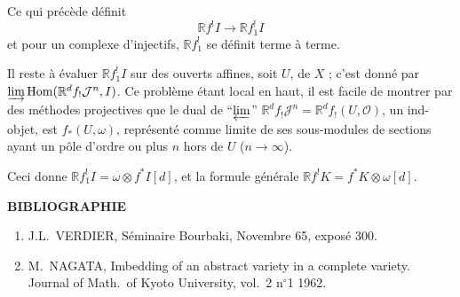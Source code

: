 \documentclass[12pt]{amsart}
\theoremstyle{plain}
\theoremstyle{definition}
\DeclareMathOperator{\Hom}{Hom}
\newcommand{\cJ}{\mathcal{J}}
\newcommand{\cO}{\mathcal{O}}
\newcommand{\bR}{\mathbb{R}}
\begin{document}
Ce qui pr\'ec\`ede d\'efinit
\[
\bR f^{!}I \to \bR f^{!}_{1}I
\]
et pour un complexe d'injectifs, $\bR f^{!}_{1}$ se d\'efinit terme \`a terme.

Il reste \`a \'evaluer $\bR f^{!}_{1}I$ sur des ouverts affines, soit $U$, de $X$ ; c'est donn\'e par $\varinjlim \Hom(\bR^{d}f_{!}\cJ^{n}, I)$. Ce probl\`eme \'etant local en haut, il est facile de montrer par des m\'ethodes projectives que le dual de ``$\varprojlim$'' $\bR^{d}f_{!}\cJ^{n} = \bR^{d}f_{!}(U,\cO)$, un ind-objet, est $f_{*}(U,\omega)$, repr\'esent\'e comme limite de ses sous-modules de sections ayant un p\^ole d'ordre ou plus $n$ hors de $U$ ($n \to \infty$).

Ceci donne $\bR f^{!}_{1}I = \omega \otimes f^{*}I[d]$, et la formule g\'en\'erale $\bR f^{!}K = f^{*}K \otimes \omega[d]$.

\bigskip

\begin{center}
\textbf{BIBLIOGRAPHIE}
\end{center}

\begin{enumerate}
\item[{[1]}] J.L.\ VERDIER, S\'eminaire Bourbaki, Novembre 65, expos\'e 300.
\item[{[2]}] M.\ NAGATA, Imbedding of an abstract variety in a complete variety. Journal of Math.\ of Kyoto University, vol.\ 2 n$^{\circ}$1 1962.
\end{enumerate}
\end{document}

